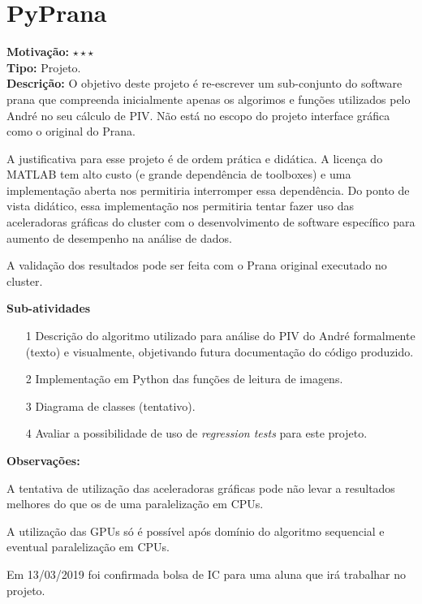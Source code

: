 \chapter{PyPrana}
\label{pyprana}

\textbf{Motivação:} $\star\star\star$\\

\textbf{Tipo:} Projeto.\\

\textbf{Descrição:} O objetivo deste projeto é re-escrever um sub-conjunto do 
software prana que compreenda inicialmente apenas os algorimos e funções 
utilizados pelo André no seu cálculo de PIV. Não está no escopo do projeto 
interface gráfica como o original do Prana.

A justificativa para esse projeto é de ordem prática e didática. A licença do 
MATLAB tem alto custo (e grande dependência de toolboxes) e uma implementação 
aberta nos permitiria interromper essa dependência. Do ponto de vista didático, 
essa implementação nos permitiria tentar fazer uso das aceleradoras gráficas 
do cluster com o desenvolvimento de software específico para aumento de 
desempenho na análise de dados.

A validação dos resultados pode ser feita com o Prana original executado no 
cluster.

\textbf{Sub-atividades}

\begin{itemize}
	\item[1] Descrição do algoritmo utilizado para análise do PIV do André 
	formalmente (texto) e visualmente, objetivando futura documentação do 
	código produzido.
	\item[2] Implementação em Python das funções de leitura de imagens.
	\item[3] Diagrama de classes (tentativo).
	\item[4] Avaliar a possibilidade de uso de \textit{regression tests} para 
	este projeto.
\end{itemize}

\textbf{Observações:}

A tentativa de utilização das aceleradoras gráficas pode não levar a resultados 
melhores do que os de uma paralelização em CPUs.

A utilização das GPUs só é possível após domínio do algoritmo sequencial e 
eventual paralelização em CPUs.

Em 13/03/2019 foi confirmada bolsa de IC para uma aluna que irá trabalhar 
no projeto.

